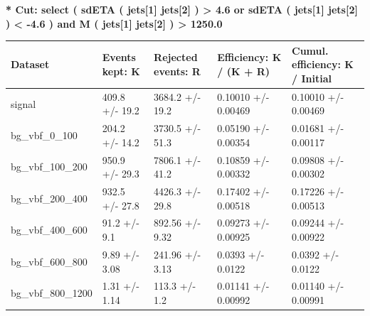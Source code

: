 \documentclass[a4paper, 10pt]{article}
\begin{document}
\textbf{* Cut: select ( sdETA ( jets[1] jets[2] ) > 4.6 or sdETA ( jets[1] jets[2] ) < -4.6 ) and M ( jets[1] jets[2] ) > 1250.0}\\
   \begin{table}[H]
  \begin{center}
    \begin{tabular}{|m{20.0mm}|m{27.0mm}|m{27.0mm}|m{33.0mm}|m{32.0mm}|}
      \hline
      {\cellcolor{yellow}         Dataset}& {\cellcolor{yellow}         Events kept:
          K}& {\cellcolor{yellow}         Rejected events:
          R}& {\cellcolor{yellow}         Efficiency:
          K /\- (K + R)}& {\cellcolor{yellow}         Cumul. efficiency:
          K /\- Initial}\\
      \hline
      {\cellcolor{white}         signal}& {\cellcolor{white}         409.8 +/\-- 19.2}& {\cellcolor{white}         3684.2 +/\-- 19.2}& {\cellcolor{white}         0.10010 +/\-- 0.00469}& {\cellcolor{white}         0.10010 +/\-- 0.00469}\\
      \hline
      {\cellcolor{white}         bg\_vbf\_0\_100}& {\cellcolor{white}         204.2 +/\-- 14.2}& {\cellcolor{white}         3730.5 +/\-- 51.3}& {\cellcolor{white}         0.05190 +/\-- 0.00354}& {\cellcolor{white}         0.01681 +/\-- 0.00117}\\
      \hline
      {\cellcolor{white}         bg\_vbf\_100\_200}& {\cellcolor{white}         950.9 +/\-- 29.3}& {\cellcolor{white}         7806.1 +/\-- 41.2}& {\cellcolor{white}         0.10859 +/\-- 0.00332}& {\cellcolor{white}         0.09808 +/\-- 0.00302}\\
      \hline
      {\cellcolor{white}         bg\_vbf\_200\_400}& {\cellcolor{white}         932.5 +/\-- 27.8}& {\cellcolor{white}         4426.3 +/\-- 29.8}& {\cellcolor{white}         0.17402 +/\-- 0.00518}& {\cellcolor{white}         0.17226 +/\-- 0.00513}\\
      \hline
      {\cellcolor{white}         bg\_vbf\_400\_600}& {\cellcolor{white}         91.2 +/\-- 9.1}& {\cellcolor{white}         892.56 +/\-- 9.32}& {\cellcolor{white}         0.09273 +/\-- 0.00925}& {\cellcolor{white}         0.09244 +/\-- 0.00922}\\
      \hline
      {\cellcolor{white}         bg\_vbf\_600\_800}& {\cellcolor{white}         9.89 +/\-- 3.08}& {\cellcolor{white}         241.96 +/\-- 3.13}& {\cellcolor{white}         0.0393 +/\-- 0.0122}& {\cellcolor{white}         0.0392 +/\-- 0.0122}\\
      \hline
      {\cellcolor{white}         bg\_vbf\_800\_1200}& {\cellcolor{white}         1.31 +/\-- 1.14}& {\cellcolor{white}         113.3 +/\-- 1.2}& {\cellcolor{white}         0.01141 +/\-- 0.00992}& {\cellcolor{white}         0.01140 +/\-- 0.00991}\\

\end{tabular}
\end{center}
\end{table}
\end{document}
